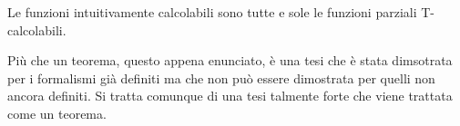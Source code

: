\begin{theorem} \label{th: church-turing}
	Le funzioni intuitivamente calcolabili sono tutte e sole
	le funzioni parziali T-calcolabili.
\end{theorem}

Più che un teorema, questo appena enunciato, è una tesi che è
stata dimsotrata per i formalismi già definiti ma che non può
essere dimostrata per quelli non ancora definiti. Si tratta
comunque di una tesi talmente forte che viene trattata come un
teorema.

